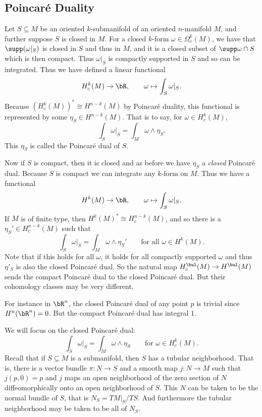 \subsection{Poincar\'e Duality}

Let $S\subseteq M$ be an oriented $k$-submanifold of an oriented $n$-manifold $M$, and further suppose $S$ is closed in $M$.
For a closed $k$-form $\omega\in\Omega_c^k(M)$, we have that $\supp(\omega|_S)$ is closed in $S$ and thus in $M$, and it is a closed subset of $\supp\omega\cap S$ which is then compact.
Thus $\omega|_S$ is compactly supported in $S$ and so can be integrated.
Thus we have defined a linear functional
$$ H^k_c(M) \to \bR,\qquad \omega \mapsto \int_S\omega|_S . $$
Because $(H^k_c(M))^*\cong H^{n-k}(M)$ by Poincar\'e duality, this functional is represented by some $\eta_S\in H^{n-k}(M)$.
That is to say, for $\omega\in H^k_c(M)$,
$$ \int_S\omega|_S = \int_M\omega\wedge\eta_S . $$
This $\eta_S$ is called the {\emphcolor Poincar\'e dual} of $S$.

Now if $S$ is compact, then it is closed and as before we have $\eta_S$ a {\it closed\/} Poincar\'e dual.
Because $S$ is compact we can integrate any $k$-form on $M$.
Thus we have a functional
$$ H^k(M) \to \bR,\qquad \omega\mapsto\int_S\omega|_S . $$
If $M$ is of finite type, then $H^k(M)^*\cong H^{n-k}_c(M)$, and so there is a $\eta_S'\in H^{n-k}_c(M)$ such that
$$ \int_S\omega|_S = \int_M\omega\wedge\eta_S'\qquad\text{for all $\omega\in H^k(M)$} . $$
Note that if this holds for all $\omega$, it holds for all compactly supported $\omega$ and thus $\eta'_S$ is also the closed Poincar\'e dual.
So the natural map $H^\bul_c(M)\to H^\bul(M)$ sends the compact Poincar\'e dual to the closed Poincar\'e dual.
But their cohomology classes may be very different.

For instance in $\bR^n$, the closed Poincar\'e dual of any point $p$ is trivial since $H^n(\bR^n)=0$.
But the compact Poincar\'e dual has integral $1$.

We will focus on the closed Poincar\'e dual:
$$ \int_S\omega|_S = \int_M\omega\wedge\eta_S \qquad\text{for $\omega\in H^k_c(M)$} . $$
Recall that if $S\subseteq M$ is a submanifold, then $S$ has a {\emphcolor tubular neighborhood}.
That is, there is a vector bundle $\pi\colon N\to S$ and a smooth map $j\colon N\to M$ such that $j(p,0)=p$ and $j$ maps an open neighborhood of the zero section of $N$ diffeomorphically
onto an open neighborhood of $S$.
This $N$ can be taken to be the normal bundle of $S$, that is $N_S=TM|_S/TS$.
And furthermore the tubular neighborhood may be taken to be all of $N_S$.

